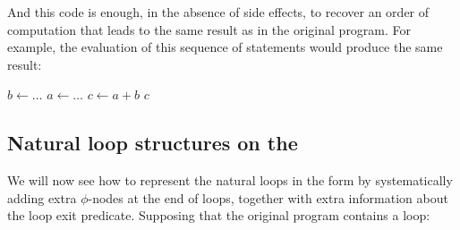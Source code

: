 {\noindent
And this \SSA{} code is enough, in the absence of side effects, to recover an order of computation that leads to the same result as in the original program. 
For example, the evaluation of this sequence of statements would produce the same result:


\begin{algorithm}[H]
$b \gets \ldots$ 
$a \gets \ldots$ 
$c \gets a + b$\;
\Return $c$\;
\end{algorithm}



\subsection{Natural loop structures on the \SSA{}}
We will now see how to represent the natural loops in the \SSA{} form by systematically adding extra $\phi$-nodes at the end of loops, together with extra information about the loop exit predicate.
Supposing that the original program contains a loop:

\centerline{}

}
